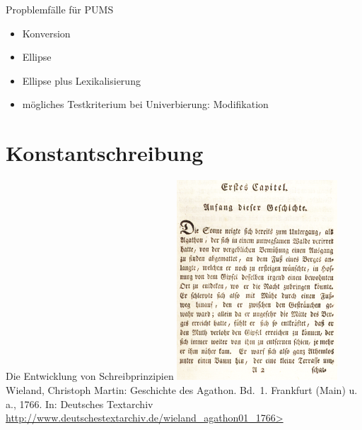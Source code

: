 \begin{frame}
  {Propblemfälle für PUMS}
  \pause
  \begin{exe}
    \ex
    \begin{xlist}
      \pause
      \pause
    \end{xlist}
    \Viertelzeile
    \pause
    \ex
    \begin{xlist}
      \pause
      \pause
    \end{xlist}
    \pause
    \Viertelzeile
    \ex
    \begin{xlist}
      \pause
    \end{xlist}
  \end{exe}
  \pause
  \begin{itemize}[<+->]
    \item Konversion
    \item Ellipse
    \item Ellipse plus Lexikalisierung
      \Halbzeile
    \item mögliches Testkriterium bei \alert{Univerbierung}: Modifikation
  \end{itemize}
\end{frame}

\section[Konstanz]{Konstantschreibung}

\begin{frame}
  {Die Entwicklung von Schreibprinzipien}
  \pause
  \centering
  \includegraphics[width=0.45\textwidth]{graphics/agathon1e}\\[0.5\baselineskip]
  {\tiny Wieland, Christoph Martin: Geschichte des Agathon. Bd.\ 1. Frankfurt (Main) u.\,a., 1766. In: Deutsches Textarchiv\\[-1\baselineskip]
    \url{http://www.deutschestextarchiv.de/wieland_agathon01_1766>}}
\end{frame}

